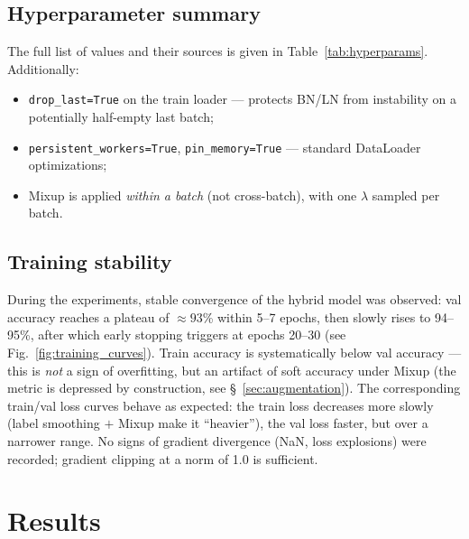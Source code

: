 \documentclass[14pt,a4paper]{extreport}
\begin{document}
\subsection{Hyperparameter summary}

The full list of values and their sources is given in
Table~\ref{tab:hyperparams}. Additionally:
\begin{itemize}
    \item \texttt{drop\_last=True} on the train loader --- protects
          BN/LN from instability on a potentially half-empty last batch;
    \item \texttt{persistent\_workers=True}, \texttt{pin\_memory=True}
          --- standard DataLoader optimizations;
    \item Mixup is applied \textit{within a batch} (not cross-batch),
          with one $\lambda$ sampled per batch.
\end{itemize}

\subsection{Training stability}

During the experiments, stable convergence of the hybrid model was
observed: val accuracy reaches a plateau of $\approx 93$\% within 5--7
epochs, then slowly rises to 94--95\%, after which early stopping
triggers at epochs 20--30 (see Fig.~\ref{fig:training_curves}). Train
accuracy is systematically below val accuracy --- this is \textit{not} a
sign of overfitting, but an artifact of soft accuracy under Mixup (the
metric is depressed by construction, see \S~\ref{sec:augmentation}). The
corresponding train/val loss curves behave as expected: the train loss
decreases more slowly (label smoothing $+$ Mixup make it ``heavier''),
the val loss faster, but over a narrower range. No signs of gradient
divergence (NaN, loss explosions) were recorded; gradient clipping at a
norm of 1.0 is sufficient.

\section{Results}
\end{document}
